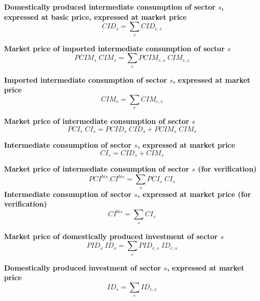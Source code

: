\documentclass[12pt]{article}
\numberwithin{equation}{section}
\begin{document}
\noindent\textbf{Domestically produced intermediate consumption of sector $s$, expressed at basic price, expressed at market price} \\
\begin{dmath}
CID_{s} = \sum_{c} CID_{c, s}
\end{dmath}

\noindent\textbf{Market price of imported intermediate consumption of sector $s$} \\
\begin{dmath}
PCIM_{s} \; CIM_{s} = \sum_{c} PCIM_{c, s} \; CIM_{c, s}
\end{dmath}

\noindent\textbf{Imported intermediate consumption of sector $s$, expressed at market price} \\
\begin{dmath}
CIM_{s} = \sum_{c} CIM_{c, s}
\end{dmath}

\noindent\textbf{Market price of intermediate consumption of sector $s$} \\
\begin{dmath}
PCI_{s} \; CI_{s} = PCID_{s} \; CID_{s} + PCIM_{s} \; CIM_{s}
\end{dmath}

\noindent\textbf{Intermediate consumption of sector $s$, expressed at market price} \\
\begin{dmath}
CI_{s} = CID_{s} + CIM_{s}
\end{dmath}

\noindent\textbf{Market price of intermediate consumption of sector $s$ (for verification)} \\
\begin{dmath}
PCI^{bis} . CI^{bis} = \sum_{s} PCI_{s} \; CI_{s}
\end{dmath}
\noindent\textbf{Intermediate consumption of sector $s$, expressed at market price (for verification)} \\
\begin{dmath}
CI^{bis} = \sum_{s} CI_{s}
\end{dmath}

\noindent\textbf{Market price of domestically produced investment of sector $s$} \\
\begin{dmath}
PID_{s} \; ID_{s} = \sum_{c} PID_{c, s} \; ID_{c, s}
\end{dmath}

\noindent\textbf{Domestically produced investment of sector $s$, expressed at market price} \\
\begin{dmath}
ID_{s} = \sum_{c} ID_{c, s}
\end{dmath}
\end{document}
